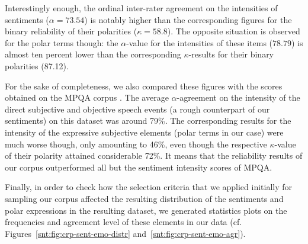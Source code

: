 Interestingly enough, the ordinal inter-rater agreement on the
intensities of sentiments ($\alpha = 73.54$) is notably higher than
the corresponding figures for the binary reliability of their
polarities ($\kappa = 58.8$).  The opposite situation is observed for
the polar terms though: the $\alpha$-value for the
intensities of these items ($78.79$) is almost ten percent lower than
the corresponding $\kappa$-results for their binary polarities
(87.12).

For the sake of completeness, we also compared these figures with the
scores obtained on the MPQA corpus \cite[cf.][pp. 38, 80]{Wilson:07}.
The average $\alpha$-agreement on the intensity of the direct
subjective and objective speech events (a rough counterpart of our
sentiments) on this dataset was around 79\%.  The corresponding
results for the intensity of the expressive subjective elements
(polar terms in our case) were much worse though, only
amounting to 46\%, even though the respective $\kappa$-value of their
polarity attained considerable 72\%.  It means that the reliability
results of our corpus outperformed all but the sentiment intensity
scores of MPQA.%

Finally, in order to check how the selection criteria that we applied
initially for sampling our corpus affected the resulting distribution
of the sentiments and polar expressions in the resulting dataset, we
generated statistics plots on the frequencies and agreement level of
these elements in our data
(cf. Figures~\ref{snt:fig:crp-sent-emo-distr}
and~\ref{snt:fig:crp-sent-emo-agr}).

